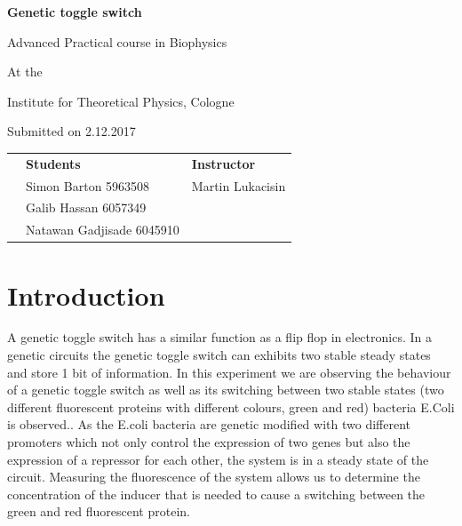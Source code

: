 \documentclass[english,11pt,a4paper]{article}
\begin{document}
\begin{titlepage}
	\centering
	\huge
	\textbf{Genetic toggle switch}
	
	\vspace{1cm}
	\huge
	Advanced Practical course in Biophysics
	
	\vspace{0.8cm}
	\normalsize
	At the
	
	\vspace{0.5cm}
	\Large
	Institute for Theoretical Physics, Cologne
	
	\vspace{1cm}
	\normalsize
	Submitted on 2.12.2017
	
	\vspace{1.5cm}
	\begin{figure}[h]
		\centering
	\end{figure}
	
	\vspace{2.5cm}
	\small
	
	\begin{centering}
		\begin{tabular}{lll}
			& \textbf{Students} & \hspace{5cm} \textbf{Instructor} \\
			& Simon Barton 5963508 & \hspace{5cm} Martin Lukacisin \\
			& Galib Hassan 6057349\\
			& Natawan Gadjisade 6045910
		\end{tabular}
	\end{centering}
	
\end{titlepage}

\tableofcontents

\pagebreak
{}

\section*{Introduction}

A genetic toggle switch has a similar function as a flip flop in electronics.
In a genetic circuits the genetic toggle switch can exhibits two stable steady states and store 1 bit of information.
In this experiment we are observing the behaviour of a genetic toggle switch as well as its switching between two stable states (two different fluorescent proteins with different colours, green and red) bacteria E.Coli is observed..
As the E.coli bacteria are genetic modified with two different promoters which not only control the expression of two genes but also the expression of a repressor for each other, the system is in a steady state of the circuit.   
Measuring the fluorescence of the system allows us  to determine the concentration of the inducer that is needed to cause a switching between the green and red fluorescent protein.
\end{document}

